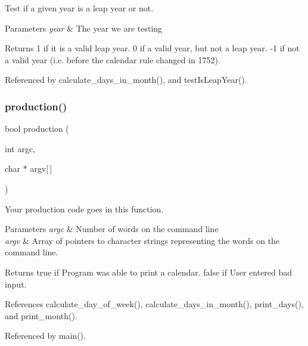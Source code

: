 Test if a given year is a leap year or not. 
\begin{DoxyParams}{Parameters}
{\em year} & The year we are testing \\
\hline
\end{DoxyParams}
\begin{DoxyReturn}{Returns}
1 if it is a valid leap year. 0 if a valid year, but not a leap year. -\/1 if not a valid year (i.\+e. before the calendar rule changed in 1752). 
\end{DoxyReturn}


Referenced by calculate\+\_\+days\+\_\+in\+\_\+month(), and test\+Is\+Leap\+Year().

\mbox{\label{production_8h_a9f67b51c42a54745557e7a2c9c07c46f}} 
\subsubsection{production()}
{\footnotesize\ttfamily bool production (\begin{DoxyParamCaption}\item[{int}]{argc,  }\item[{char $\ast$}]{argv[$\,$] }\end{DoxyParamCaption})}

Your production code goes in this function.


\begin{DoxyParams}{Parameters}
{\em argc} & Number of words on the command line \\
\hline
{\em argv} & Array of pointers to character strings representing the words on the command line. \\
\hline
\end{DoxyParams}
\begin{DoxyReturn}{Returns}
true if Program was able to print a calendar. false if User entered bad input. 
\end{DoxyReturn}


References calculate\+\_\+day\+\_\+of\+\_\+week(), calculate\+\_\+days\+\_\+in\+\_\+month(), print\+\_\+days(), and print\+\_\+month().



Referenced by main().

